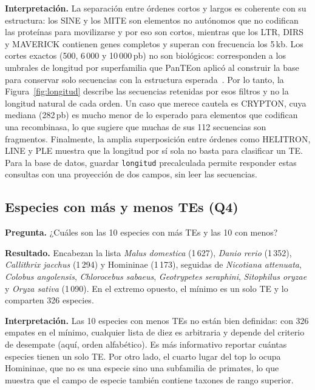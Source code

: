 \textbf{Interpretación.} La separación entre órdenes cortos y largos es
coherente con su estructura: los SINE y los MITE son elementos no
autónomos que no codifican las proteínas para movilizarse y por eso son
cortos, mientras que los LTR, DIRS y MAVERICK contienen genes completos y
superan con frecuencia los 5\,kb. Los cortes exactos (500, 6\,000 y
10\,000\,pb) no son biológicos: corresponden a los umbrales de longitud
por superfamilia que PanTEon aplicó al construir la base para conservar
solo secuencias con la estructura esperada~\cite{orozcoarias2026panteon}.
Por lo tanto, la Figura~\ref{fig:longitud} describe las secuencias
retenidas por esos filtros y no la longitud natural de cada orden. Un
caso que merece cautela es CRYPTON, cuya mediana (282\,pb) es mucho menor
de lo esperado para elementos que codifican una recombinasa, lo que
sugiere que muchas de sus 112 secuencias son fragmentos. Finalmente, la
amplia superposición entre órdenes como HELITRON, LINE y PLE muestra que
la longitud por sí sola no basta para clasificar un TE. Para la base de
datos, guardar \texttt{longitud} precalculada permite responder estas
consultas con una proyección de dos campos, sin leer las secuencias.
 
\subsection{Especies con más y menos TEs (Q4)}
 
\textbf{Pregunta.} ¿Cuáles son las 10 especies con más TEs y las 10 con menos?
 
\textbf{Resultado.} Encabezan la lista \textit{Malus domestica} (1\,627),
\textit{Danio rerio} (1\,352), \textit{Callithrix jacchus} (1\,294) y
Homininae (1\,173), seguidas de \textit{Nicotiana attenuata},
\textit{Colobus angolensis}, \textit{Chlorocebus sabaeus},
\textit{Geotrypetes seraphini}, \textit{Sitophilus oryzae} y
\textit{Oryza sativa} (1\,090). En el extremo opuesto, el mínimo es un
solo TE y lo comparten 326 especies.
 
\textbf{Interpretación.} Las 10 especies con menos TEs no están bien
definidas: con 326 empates en el mínimo, cualquier lista de diez es
arbitraria y depende del criterio de desempate (aquí, orden alfabético).
Es más informativo reportar cuántas especies tienen un solo TE. Por otro
lado, el cuarto lugar del top lo ocupa Homininae, que no es una especie
sino una subfamilia de primates, lo que muestra que el campo de especie
también contiene taxones de rango superior.
 
